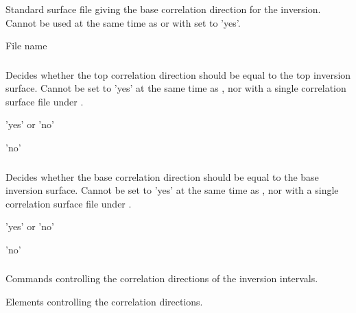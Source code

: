 \subsubsection{}
 \slist
   \item \Description Standard surface file giving the base correlation direction for the inversion. Cannot be used at the same time as  or with  set to 'yes'.
   \item \Argument File name
   \item \Default
 \elist

\subsubsection{}
 \slist
   \item \Description Decides whether the top correlation direction should be equal to the top inversion surface. Cannot be set to 'yes' at the same time as , nor with a single correlation surface file under .
   \item \Argument 'yes' or 'no'
   \item \Default 'no'
 \elist

\subsubsection{}
 \slist
   \item \Description Decides whether the base correlation direction should be equal to the base inversion surface. Cannot be set to 'yes' at the same time as , nor with a single correlation surface file under .
   \item \Argument 'yes' or 'no'
   \item \Default 'no'
 \elist

\subsubsection{}
 \slist
   \item \Description Commands controlling the correlation directions of the inversion intervals.
   \item \Argument Elements controlling the correlation directions.
   \item \Default
 \elist


